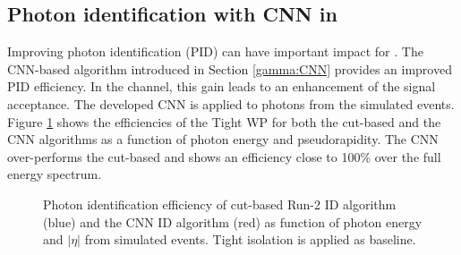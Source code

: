 \subsection{Photon identification with CNN in \HHyybb}
\label{HL-LHC:Run-3:CNN}

Improving photon identification (PID) can have important impact for \HHyybb. The CNN-based algorithm introduced in Section \ref{gamma:CNN} provides an improved PID efficiency. In the \HHyybb channel, this gain leads to an enhancement of the signal acceptance. The developed CNN is applied to photons from the \HHyybb simulated events.  Figure \ref{fig:HL-LHC:Run-3:CNN:E} shows the efficiencies of the Tight WP for both the cut-based and the CNN algorithms as a function of photon energy and pseudorapidity. The CNN over-performs the cut-based and shows an efficiency close to 100\% over the full energy spectrum.
\begin{figure}[htbp]
    \centering
    \begin{tcolorbox}[colback=black!5!white, colframe=white!75!black]
    \caption{Photon identification efficiency of cut-based Run-2 ID algorithm (blue) and the CNN ID algorithm (red) as function of photon energy and $|\eta|$ from \HHyybb simulated events. Tight isolation is applied as baseline.}
    \label{fig:HL-LHC:Run-3:CNN:E}
    \end{tcolorbox}
\end{figure}

